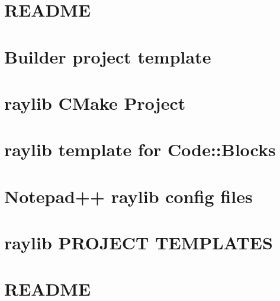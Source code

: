 \let\mypdfximage\pdfximage\def\pdfximage{\immediate\mypdfximage}\documentclass[twoside]{book}
\newcommand{\+}{\discretionary{\mbox{\scriptsize$\hookleftarrow$}}{}{}}
\begin{document}
\chapter{README}
\label{md_build__deps_raylib_src_projects_Builder_examples_README}

\chapter{Builder project template}
\label{md_build__deps_raylib_src_projects_Builder_README}

\chapter{raylib CMake Project}
\label{md_build__deps_raylib_src_projects_CMake_README}

\chapter{raylib template for Code\+::Blocks}
\label{md_build__deps_raylib_src_projects_CodeBlocks_README}

\chapter{Notepad++ raylib config files}
\label{md_build__deps_raylib_src_projects_Notepad___README}

\chapter{raylib PROJECT TEMPLATES}
\label{md_build__deps_raylib_src_projects_README}

\chapter{README}
\label{md_build__deps_raylib_src_projects_scripts_README}

\end{document}
